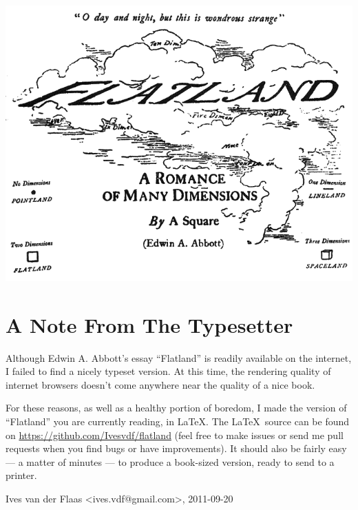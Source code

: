 \documentclass[12pt, a4paper, twoside]{memoir}
\begin{document}

\thispagestyle{empty} 
\begin{vplace}[0.5]
\includegraphics[trim=0mm 0mm 0mm 0mm,width=\linewidth]{flatland_cover}
\end{vplace}

\clearpage

\frontmatter
\chapter*{A Note From The Typesetter}
Although Edwin A. Abbott's essay ``Flatland'' is readily available on the
internet, I failed to find a nicely typeset version. At this time,
the rendering quality of internet browsers doesn't come anywhere near the
quality of a nice book. 

For these reasons, as well as a healthy portion of boredom, I made the version
of ``Flatland'' you are currently reading, in \LaTeX. The \LaTeX\ source can be
found on \url{https://github.com/Ivesvdf/flatland} (feel free to make issues
or send me pull requests when you find bugs or have improvements). It should
also be fairly easy --- a matter of minutes --- to produce a book-sized
version, ready to send to a printer. 

\vspace{1cm}

\hfill Ives van der Flaas <ives.vdf@gmail.com>, 2011-09-20
\end{document}
